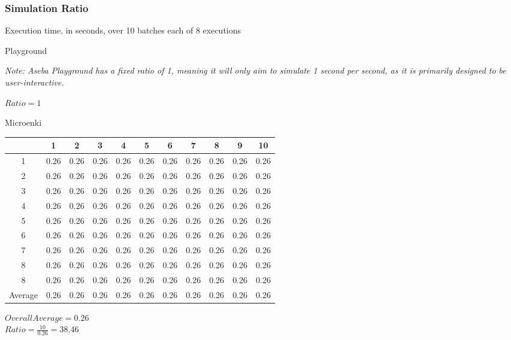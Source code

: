 \subsubsection{Simulation Ratio}
\begin{center}
    Execution time, in seconds, over 10 batches each of 8 executions

    Playground

    \textit{Note: Aseba Playground has a fixed ratio of 1, meaning it will
        only aim to simulate 1 second per second, as it is primarily designed
        to be user-interactive.}

    $ Ratio = 1 $

    Microenki\\
    \begin{tabular}{ |c|c|c|c|c|c|c|c|c|c|c| }
        \hline
          & 1 & 2 & 3 & 4 & 5 & 6 & 7 & 8 & 9 & 10 \\
        \hline
        \hline
         1 & 0.26 & 0.26 & 0.26 & 0.26  & 0.26  & 0.26  & 0.26  & 0.26  & 0.26  & 0.26 \\
         2 & 0.26 & 0.26 & 0.26 & 0.26  & 0.26  & 0.26  & 0.26  & 0.26  & 0.26  & 0.26 \\
         3 & 0.26 & 0.26 & 0.26 & 0.26  & 0.26  & 0.26  & 0.26  & 0.26  & 0.26  & 0.26 \\
         4 & 0.26 & 0.26 & 0.26 & 0.26  & 0.26  & 0.26  & 0.26  & 0.26  & 0.26  & 0.26 \\
         5 & 0.26 & 0.26 & 0.26 & 0.26  & 0.26  & 0.26  & 0.26  & 0.26  & 0.26  & 0.26 \\
         6 & 0.26 & 0.26 & 0.26 & 0.26  & 0.26  & 0.26  & 0.26  & 0.26  & 0.26  & 0.26 \\
         7 & 0.26 & 0.26 & 0.26 & 0.26  & 0.26  & 0.26  & 0.26  & 0.26  & 0.26  & 0.26 \\
         8 & 0.26 & 0.26 & 0.26 & 0.26  & 0.26  & 0.26  & 0.26  & 0.26  & 0.26  & 0.26 \\
         8 & 0.26 & 0.26 & 0.26 & 0.26  & 0.26  & 0.26  & 0.26  & 0.26  & 0.26  & 0.26 \\
        \hline
        \hline
        Average & 0.26 & 0.26 & 0.26 & 0.26 & 0.26 & 0.26 & 0.26 & 0.26 & 0.26 & 0.26 \\
        \hline
    \end{tabular}

    $ Overall Average = 0.26 $\\
    $ Ratio = \frac{10}{0.26} = 38.46 $

\end{center}
